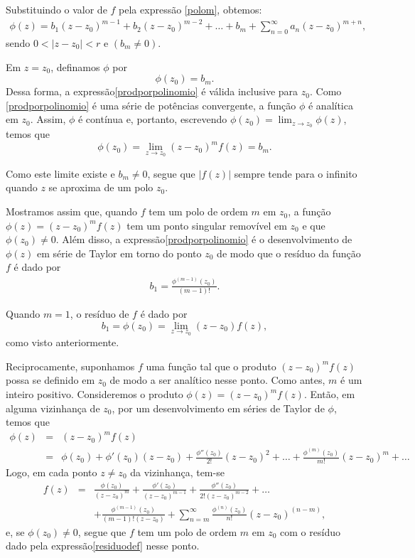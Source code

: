 Substituindo o valor de $f$ pela expressão \eqref{polom}, obtemos:
\begin{eqnarray}\label{prodporpolinomio}
\phi(z)=b_1(z-z_0)^{m-1}+b_2(z-z_0)^{m-2}+\ldots+b_m+\sum_{n=0}^{\infty}a_n(z-z_0)^{m+n},
\end{eqnarray}
sendo $0<|z-z_0|<r$ e $(b_m\neq0)$.

Em $z=z_0$, definamos $\phi$ por
$$\phi(z_0)=b_m.$$
Dessa forma, a expressão\eqref{prodporpolinomio} é válida inclusive para $z_0$. Como \eqref{prodporpolinomio} é uma série de potências convergente, a função $\phi$ é analítica em $z_0$. Assim, $\phi$ é contínua e, portanto, escrevendo $\phi(z_0)=\lim_{z\to z_0}\phi(z)$, temos que
$$\phi(z_0)=\lim_{z\to z_0}(z-z_0)^mf(z)=b_m.$$

Como este limite existe e $b_m\neq0$, segue que $|f(z)|$ sempre tende para o infinito quando $z$ se aproxima de um polo $z_0$.

Mostramos assim que, quando $f$ tem um polo de ordem $m$ em $z_0$, a função $\phi(z)=(z-z_0)^mf(z)$ tem um ponto singular removível em $z_0$ e que $\phi(z_0)\neq0$. Além disso, a expressão\eqref{prodporpolinomio} é o desenvolvimento de $\phi(z)$ em série de Taylor em torno do ponto $z_0$ de modo que o resíduo da função $f$ é dado por
\begin{eqnarray}
\label{residuodef}
b_1=\frac{\phi^{(m-1)}(z_0)}{(m-1)!}.
\end{eqnarray}

Quando $m=1$, o resíduo de $f$ é dado por
$$b_1=\phi(z_0)=\lim_{z\to z_0}(z-z_0)f(z),$$
como visto anteriormente.

Reciprocamente, suponhamos $f$ uma função tal que o produto $(z-z_0)^m f(z)$ possa se definido em $z_0$ de modo a ser analítico nesse ponto. Como antes, $m$ é um inteiro positivo. Consideremos o produto $\phi(z)=(z-z_0)^mf(z)$. Então, em alguma vizinhança de $z_0$, por um desenvolvimento em séries de Taylor de $\phi$, temos que
$$\begin{array}{rcl}
\phi(z)
&=& (z-z_0)^m f(z) \\
&=& \phi(z_0)+\phi'(z_0)(z-z_0)+\frac{\phi''(z_0)}{2!}(z-z_0)^2+\ldots+\frac{\phi^{(m)}(z_0)}{m!}(z-z_0)^m +\ldots
\end{array}$$
Logo, em cada ponto $z\neq z_0$ da vizinhança, tem-se
\begin{eqnarray*}
f(z)
&=& \frac{\phi(z_0)}{(z-z_0)^m}+\frac{\phi'(z_0)}{(z-z_0)^{m-1}}+\frac{\phi''(z_0)}{2!(z-z_0)^{m-2}}+\ldots\\
&& + \frac{\phi^{(m-1)}(z_0)}{(m-1)!(z-z_0)}+ \sum_{n=m}^{\infty}\frac{\phi^{(n)}(z_0)}{n!}(z-z_0)^{(n-m)},
\end{eqnarray*}
e, se $\phi(z_0) \neq 0$, segue que $f$ tem um polo de ordem $m$ em $z_0$ com o resíduo dado pela expressão\eqref{residuodef} nesse ponto.

